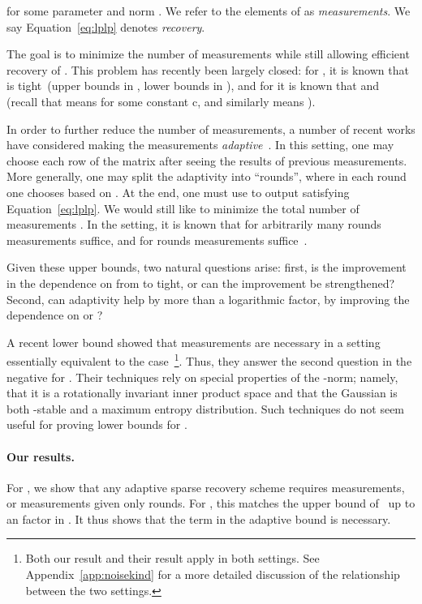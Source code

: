\documentclass[twoside,leqno,twocolumn]{article}
\begin{document}
for some parameter  and norm .  We refer to the elements
of  as \emph{measurements}.  We say Equation~\eqref{eq:lplp}
denotes \emph{ recovery}.

The goal is to minimize the number of measurements while still
allowing efficient recovery of .  This problem has recently been
largely closed: for , it is known that  is tight~(upper bounds in \cite{CRT06,GLPS}, lower
bounds in \cite{PW11,CD11}), and for  it is known that  and ~\cite{PW11} (recall that
 means  for some constant c, and
similarly  means ).

In order to further reduce the number of measurements, a number of recent works
have considered making the measurements
\emph{adaptive}~\cite{JXC,CHNR,HCN,HBCN,MSW,AWZ,IPW11}.
In this setting, one may choose each row of the matrix after seeing
the results of previous measurements.  More generally, one may split
the adaptivity into  ``rounds'', where in each round  one
chooses  based on .
At the end, one must use  to output 
satisfying Equation~\eqref{eq:lplp}.  We would still like to minimize
the total number of measurements .  In the 
setting, it is known that for arbitrarily many rounds
 measurements suffice, and for
 rounds 
measurements suffice~\cite{IPW11}.  

Given these upper bounds, two natural questions arise: first, is the
improvement in the dependence on  from  to  tight, or can the improvement be strengthened?  Second, can
adaptivity help by more than a logarithmic factor, by improving the
dependence on  or ?

A recent lower bound showed that  measurements are
necessary in a setting essentially equivalent to the 
case~\cite{ACD11}\footnote{Both our result and their result apply in
  both settings.  See Appendix~\ref{app:noisekind} for a more detailed
  discussion of the relationship between the two settings.}.  Thus, they
answer the second question in the negative for .
Their techniques rely on special properties of the
-norm; namely, that it is a rotationally invariant inner product
space and that the Gaussian is both -stable and a maximum entropy
distribution.  Such techniques do not seem useful for proving lower
bounds for .

\paragraph{Our results.} For , we show that any adaptive sparse
recovery scheme requires  measurements, or
 measurements given only  rounds.  For , this matches the upper bound of~\cite{IPW11} up to an
 factor in .  It thus shows that the 
term in the adaptive bound is necessary.
\end{document}
